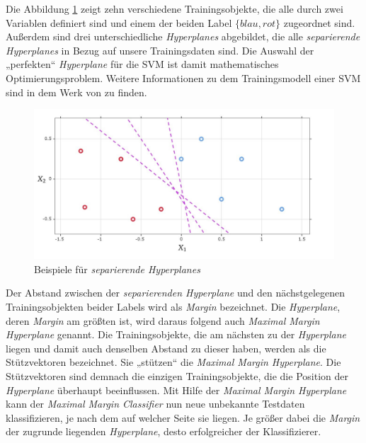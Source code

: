 Die Abbildung \ref{fig:separating_hyperplanes} zeigt zehn verschiedene Trainingsobjekte, die alle durch zwei Variablen definiert sind und
einem der beiden Label $\{blau, rot\}$ zugeordnet sind. Außerdem sind drei unterschiedliche \textit{Hyperplanes} abgebildet, die alle 
\textit{separierende Hyperplanes} in Bezug auf unsere Trainingsdaten sind. Die Auswahl der „perfekten“ \textit{Hyperplane} für die SVM ist
damit mathematisches Optimierungsproblem. 
Weitere Informationen zu dem Trainingsmodell einer SVM sind in dem Werk von \citeauthor{suthaharan_2015} zu finden.\cite[S. 210ff.]{suthaharan_2015}
\begin{figure}[H]
	\centering
	\includegraphics[width=\imgMed]{images/theory/separating_hyperplanes.jpg}
	\caption{Beispiele für \textit{separierende Hyperplanes}} 
	\label{fig:separating_hyperplanes}
\end{figure}
Der Abstand zwischen der \textit{separierenden Hyperplane} und den nächstgelegenen Trainingsobjekten beider Labels
wird als \textit{Margin} bezeichnet. Die \textit{Hyperplane}, deren \textit{Margin} am größten ist,
wird daraus folgend auch \textit{Maximal Margin Hyperplane} genannt.
Die Trainingsobjekte, die am nächsten zu der \textit{Hyperplane} liegen und damit auch denselben Abstand zu dieser haben,
werden als die Stützvektoren bezeichnet. Sie „stützen“ die \textit{Maximal Margin Hyperplane}.
Die Stützvektoren sind demnach die einzigen Trainingsobjekte, die die Position der \textit{Hyperplane} überhaupt beeinflussen.\cite[S. 341]{james_2013}
Mit Hilfe der \textit{Maximal Margin Hyperplane} kann der 
\textit{Maximal Margin Classifier} nun neue unbekannte Testdaten klassifizieren, je nach dem auf welcher Seite sie liegen.
Je größer dabei die \textit{Margin} der zugrunde liegenden \textit{Hyperplane}, desto erfolgreicher der Klassifizierer.\cite[S. 1566]{noble_2006}

